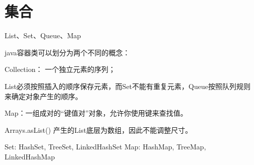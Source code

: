 \chapter{集合}
\label{chap:collection}

List、Set、Queue、Map

java容器类可以划分为两个不同的概念：

Collection： 一个独立元素的序列；

List必须按照插入的顺序保存元素，而Set不能有重复元素，Queue按照队列规则
来确定对象产生的顺序。

Map：一组成对的“键值对”对象，允许你使用键来查找值。


Arrays.asList() 产生的List底层为数组，因此不能调整尺寸。

Set: HashSet, TreeSet, LinkedHashSet
Map: HashMap, TreeMap, LinkedHashMap







